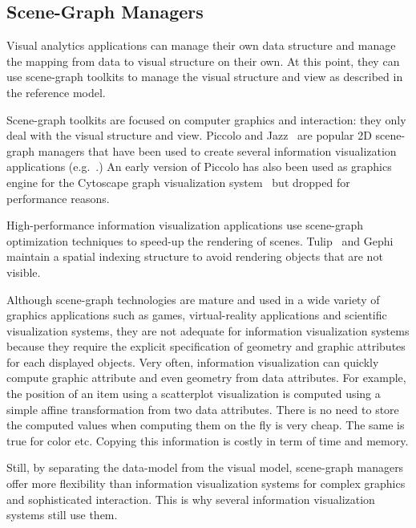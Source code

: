 \subsection{Scene-Graph Managers}

Visual analytics applications can manage their own data structure and
manage the mapping from data to visual structure on their own.  At
this point, they can use scene-graph toolkits to manage the
visual structure and view as described in the reference model.

Scene-graph toolkits are focused on computer graphics and interaction:
they only deal with the visual structure and view.  Piccolo and
Jazz~\cite{Polylithic} are popular 2D scene-graph managers that have
been used to create several information visualization applications
(e.g.~\cite{SpaceTree,Geneaquilt}.) An early version of Piccolo has
also been used as graphics engine for the Cytoscape graph
visualization system~\cite{Cytoscape} but dropped for performance
reasons.

High-performance information visualization applications use
scene-graph optimization techniques to speed-up the rendering of
scenes.  Tulip~\cite{Tulip} and Gephi~\cite{Gephi} maintain a spatial
indexing structure to avoid rendering objects that are not visible.

Although scene-graph technologies are mature and used in a wide
variety of graphics applications such as games, virtual-reality
applications and scientific visualization systems, they are not
adequate for information visualization systems because they require
the explicit specification of geometry and graphic attributes for each
displayed objects.  Very often, information visualization can quickly
compute graphic attribute and even geometry from data attributes.  For
example, the position of an item using a scatterplot visualization is
computed using a simple affine transformation from two data
attributes.  There is no need to store the computed values when
computing them on the fly is very cheap.  The same is true for color
etc.  Copying this information is costly in term of time and memory.

Still, by separating the data-model from the visual model, scene-graph
managers offer more flexibility than information visualization systems
for complex graphics and sophisticated interaction.  This is why
several information visualization systems still use them.


